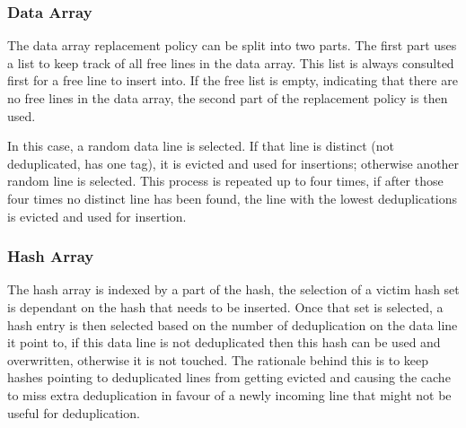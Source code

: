 \subsubsection{Data Array}
\label{sssec:DedupDataRepl}
The data array replacement policy can be split into two parts. The first part uses a list to keep track of all free lines in the data array. This list is always consulted first for a free line to insert into. If the free list is empty, indicating that there are no free lines in the data array, the second part of the replacement policy is then used.\par
In this case, a random data line is selected. If that line is distinct (not deduplicated, has one tag), it is evicted and used for insertions; otherwise another random line is selected. This process is repeated up to four times, if after those four times no distinct line has been found, the line with the lowest deduplications is evicted and used for insertion.
\subsubsection{Hash Array}
\label{sssec:DedupHashRepl}
The hash array is indexed by a part of the hash, the selection of a victim hash set is dependant on the hash that needs to be inserted. Once that set is selected, a hash entry is then selected based on the number of deduplication on the data line it point to, if this data line is not deduplicated then this hash can be used and overwritten, otherwise it is not touched. The rationale behind this is to keep hashes pointing to deduplicated lines from getting evicted and causing the cache to miss extra deduplication in favour of a newly incoming line that might not be useful for deduplication.\par

